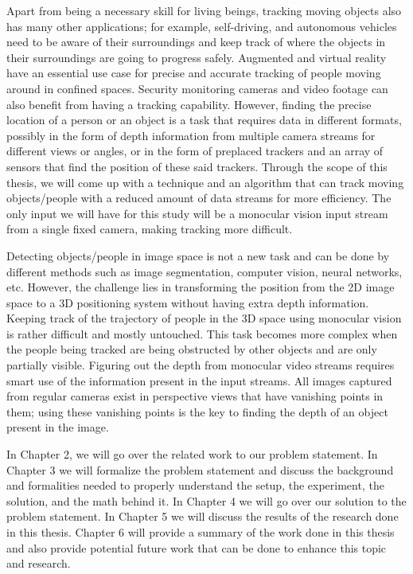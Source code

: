 \documentclass[12pt]{report}
\begin{document}
Apart from being a necessary skill for living beings, tracking moving objects also has many other applications; for example, self-driving, and autonomous vehicles need to be aware of their surroundings and keep track of where the objects in their surroundings are going to progress safely. Augmented and virtual reality have an essential use case for precise and accurate tracking of people moving around in confined spaces. Security monitoring cameras and video footage can also benefit from having a tracking capability. However, finding the precise location of a person or an object is a task that requires data in different formats, possibly in the form of depth information from multiple camera streams for different views or angles, or in the form of preplaced trackers and an array of sensors that find the position of these said trackers. Through the scope of this thesis, we will come up with a technique and an algorithm that can track moving objects/people with a reduced amount of data streams for more efficiency. The only input we will have for this study will be a monocular vision input stream from a single fixed camera, making tracking more difficult.\newline

Detecting objects/people in image space is not a new task and can be done by different methods such as image segmentation, computer vision, neural networks, etc. However, the challenge lies in transforming the position from the 2D image space to a 3D positioning system without having extra depth information. Keeping track of the trajectory of people in the 3D space using monocular vision is rather difficult and mostly untouched. This task becomes more complex when the people being tracked are being obstructed by other objects and are only partially visible. Figuring out the depth from monocular video streams requires smart use of the information present in the input streams. All images captured from regular cameras exist in perspective views that have vanishing points in them; using these vanishing points is the key to finding the depth of an object present in the image.\newline

In Chapter 2, we will go over the related work to our problem statement. In Chapter 3 we will formalize the problem statement and discuss the background and formalities needed to properly understand the setup, the experiment, the solution, and the math behind it. In Chapter 4 we will go over our solution to the problem statement. In Chapter 5 we will discuss the results of the research done in this thesis. Chapter 6 will provide a summary of the work done in this thesis and also provide potential future work that can be done to enhance this topic and research.
\end{document}
